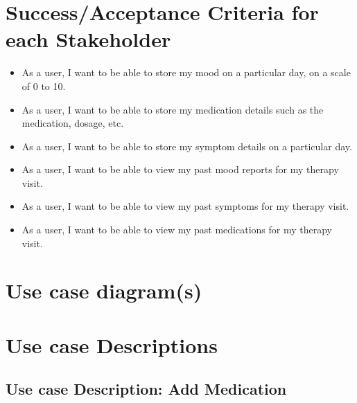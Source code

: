 \documentclass[11pt]{article}
\begin{document}
    \pagebreak


    \section{Success/Acceptance Criteria for each Stakeholder}\label{sec:success/acceptance-criteria-for-each-stakeholder}


    \begin{itemize}
        \item As a user, I want to be able to store my mood on a particular day, on a scale of 0 to 10.
        \item As a user, I want to be able to store my medication details such as the medication, dosage, etc.
        \item As a user, I want to be able to store my symptom details on a particular day.
        \item As a user, I want to be able to view my past mood reports for my therapy visit.
        \item As a user, I want to be able to view my past symptoms for my therapy visit.
        \item As a user, I want to be able to view my past medications for my therapy visit.
    \end{itemize}

    \pagebreak


    \section{Use case diagram(s)}\label{sec:use-case-diagram(s)}

    \pagebreak


    \section{Use case Descriptions}\label{sec:use-case-descriptions}

    \subsection{Use case Description: Add Medication}\label{subsec:use-case-description:-add-medication}
\end{document}
